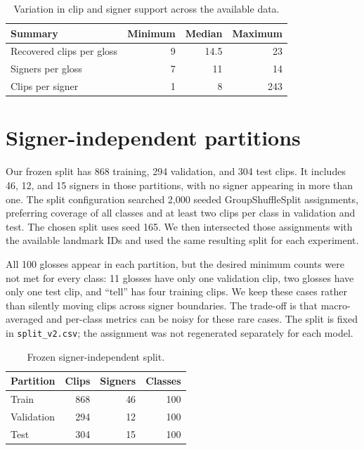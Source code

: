 \documentclass[12pt,a4paper,oneside]{report}
\begin{document}
\begin{table}[H]
\centering
\label{tab:class-support}
\begin{tabular}{lrrr}
\toprule
Summary & Minimum & Median & Maximum \\
\midrule
Recovered clips per gloss & 9 & 14.5 & 23 \\
Signers per gloss & 7 & 11 & 14 \\
Clips per signer & 1 & 8 & 243 \\
\bottomrule
\end{tabular}
\caption{Variation in clip and signer support across the available data.}
\end{table}

\section{Signer-independent partitions}
Our frozen split has 868 training, 294 validation, and 304 test clips. It includes 46, 12, and 15 signers in those partitions, with no signer appearing in more than one. The split configuration searched 2,000 seeded GroupShuffleSplit assignments, preferring coverage of all classes and at least two clips per class in validation and test. The chosen split uses seed 165. We then intersected those assignments with the available landmark IDs and used the same resulting split for each experiment.

All 100 glosses appear in each partition, but the desired minimum counts were not met for every class: 11 glosses have only one validation clip, two glosses have only one test clip, and ``tell'' has four training clips. We keep these cases rather than silently moving clips across signer boundaries. The trade-off is that macro-averaged and per-class metrics can be noisy for these rare cases. The split is fixed in \texttt{split\_v2.csv}; the assignment was not regenerated separately for each model.

\begin{table}[H]
\centering
\label{tab:split}
\begin{tabular}{lrrr}
\toprule
Partition & Clips & Signers & Classes \\
\midrule
Train & 868 & 46 & 100 \\
Validation & 294 & 12 & 100 \\
Test & 304 & 15 & 100 \\
\bottomrule
\end{tabular}
\caption{Frozen signer-independent split.}
\end{table}
\end{document}
